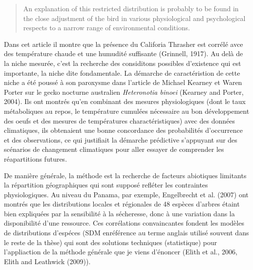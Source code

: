 \begin{quote}
An explanation of this restricted distribution is probably to be found
in the close adjustment of the bird in various physiological and
psychological respects to a narrow range of environmental conditions.
\end{quote}

Dans cet article il montre que la présence du Califoria Thrasher est
corrélé avce des température chaude et une humudité suffisante
(Grinnell, 1917). Au delà de la niche mesurée, c'est la recherche des
considitons possibles d'existence qui est importante, la niche dite
fondamentale. La démarche de caractéristion de cette niche a été poussé
à son paroxysme dans l'article de Michael Kearney et Waren Porter sur le
gecko nocturne australien \emph{Heteronotia binoei} (Kearney and Porter,
2004). Ils ont montrés qu'en combinant des mesures physiologiques (dont
le taux métaboliques au repos, le température cumulées nécessaire au bon
développement des oeufs et des mesures de températures
charactéristiques) avec des données climatiques, ils obtenaient une
bonne concordance des probabilités d'occurrence et des observations, ce
qui justifiait la démarche prédictive s'appuyant sur des scénarios de
changement climatiques pour aller essayer de comprender les
réapartitions futures.

De manière générale, la méthode est la recherche de facteurs abiotiques
limitants la répartition géographiques qui sont supposé refléter les
contraintes physiologiques. Au niveau du Panama, par exemple,
Engelbrecht et al. (2007) ont montrés que les distributions locales et
régionales de 48 espèces d'arbres étaint bien expliquées par la
sensibilité à la sécheresse, donc à une variation dans la disponibilité
d'une ressource. Ces corrélations convaincantes fondent les modèles de
distributions d'espéces (SDM enréférence au terme anglais utilisé
souvent dans le reste de la thèse) qui sont des solutions techniques
(statistique) pour l'appliaction de la méthode générale que je viens
d'énoncer (Elith et al., 2006, Elith and Leathwick (2009)).

